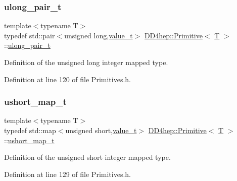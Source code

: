 \subsubsection{\texorpdfstring{ulong\+\_\+pair\+\_\+t}{ulong\_pair\_t}}
{\footnotesize\ttfamily template$<$typename T$>$ \\
typedef std\+::pair$<$unsigned long,\hyperlink{struct_d_d4hep_1_1_primitive_a0639e73bb8f07f99c2d8401f807a7af6}{value\+\_\+t}$>$ \hyperlink{struct_d_d4hep_1_1_primitive}{D\+D4hep\+::\+Primitive}$<$ \hyperlink{class_t}{T} $>$\+::\hyperlink{struct_d_d4hep_1_1_primitive_a776a90beccb1b044c258b851c8128509}{ulong\+\_\+pair\+\_\+t}}



Definition of the unsigned long integer mapped type. 



Definition at line 120 of file Primitives.\+h.

\hypertarget{struct_d_d4hep_1_1_primitive_a05bca6a7dcdad2a935793e45d9746079}{}\label{struct_d_d4hep_1_1_primitive_a05bca6a7dcdad2a935793e45d9746079} 
\subsubsection{\texorpdfstring{ushort\+\_\+map\+\_\+t}{ushort\_map\_t}}
{\footnotesize\ttfamily template$<$typename T$>$ \\
typedef std\+::map$<$unsigned short,\hyperlink{struct_d_d4hep_1_1_primitive_a0639e73bb8f07f99c2d8401f807a7af6}{value\+\_\+t}$>$ \hyperlink{struct_d_d4hep_1_1_primitive}{D\+D4hep\+::\+Primitive}$<$ \hyperlink{class_t}{T} $>$\+::\hyperlink{struct_d_d4hep_1_1_primitive_a05bca6a7dcdad2a935793e45d9746079}{ushort\+\_\+map\+\_\+t}}



Definition of the unsigned short integer mapped type. 



Definition at line 129 of file Primitives.\+h.

\hypertarget{struct_d_d4hep_1_1_primitive_a17a1fe85259c15331aeaa9e4f3f25ac0}{}\label{struct_d_d4hep_1_1_primitive_a17a1fe85259c15331aeaa9e4f3f25ac0} 
